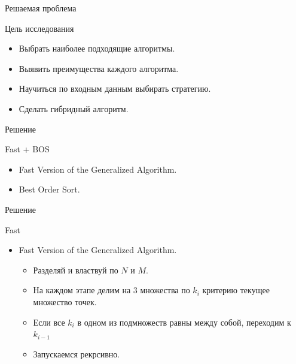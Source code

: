 \documentclass{beamer}
\begin{document}
\begin{frame}{Решаемая проблема}
\begin{block}{Цель исследования}
\begin{itemize}
\item Выбрать наиболее подходящие алгоритмы.
\item Выявить преимущества каждого алгоритма.
\item Научиться по входным данным выбирать стратегию.
\item Сделать гибридный алгоритм.
\end{itemize}
\end{block}
\end{frame}


\begin{frame}{Решение}
\begin{block}{Fast + BOS}
\begin{center}
\end{center}
\begin{itemize}
\item Fast Version of the Generalized Algorithm. 
\item Best Order Sort.
\end{itemize}
\end{block}
\end{frame}

\begin{frame}{Решение}
\begin{block}{Fast}
\begin{center}
\end{center}
\begin{itemize}
\item Fast Version of the Generalized Algorithm.
\begin{itemize}
\item Разделяй и властвуй по $N$ и $M$. 
\item На каждом этапе делим на 3 множества по $k_i$ критерию текущее множество точек.
\item Если все $k_i$ в одном из подмножеств равны между собой, переходим к $k_{i-1}$
\item Запускаемся рекрсивно.
\end{itemize}
\end{itemize}
\end{block}
\end{frame}
\end{document}

